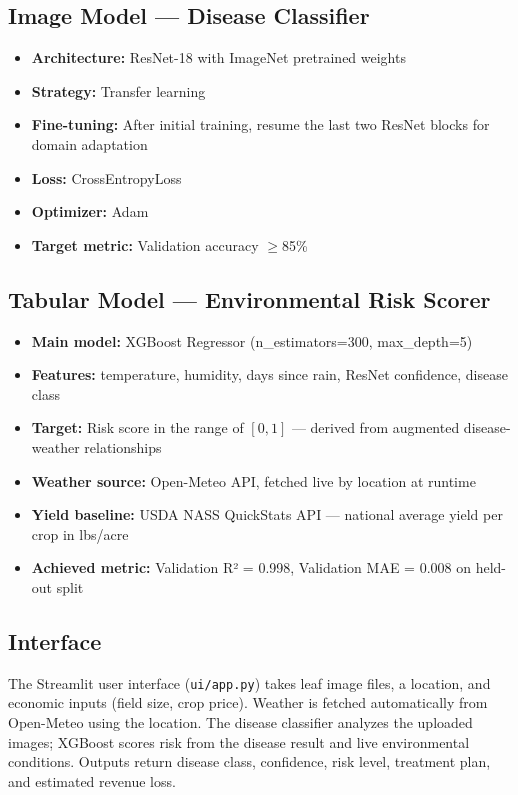 \documentclass[11pt, letterpaper]{article}
\begin{document}
\vspace{0.5em}

\subsection{Image Model — Disease Classifier}
\begin{itemize}
  \item \textbf{Architecture:} ResNet-18 with ImageNet pretrained weights
  \item \textbf{Strategy:} Transfer learning
  \item \textbf{Fine-tuning:} After initial training, resume the last two ResNet blocks for domain adaptation
  \item \textbf{Loss:} CrossEntropyLoss
  \item\textbf{Optimizer:} Adam 
  \item \textbf{Target metric:} Validation accuracy $\geq$85\%
\end{itemize}

\subsection{Tabular Model — Environmental Risk Scorer}
\begin{itemize}
  \item \textbf{Main model:} XGBoost Regressor (n\_estimators=300, max\_depth=5)
  \item \textbf{Features:} temperature, humidity, days since rain, ResNet confidence, disease class
  \item \textbf{Target:} Risk score in  the range of $[0, 1]$ — derived from augmented disease-weather relationships
  \item \textbf{Weather source:} Open-Meteo API, fetched live by location at runtime
  \item \textbf{Yield baseline:} USDA NASS QuickStats API — national average yield per crop in lbs/acre
  \item \textbf{Achieved metric:} Validation R² = 0.998, Validation MAE = 0.008 on held-out split
\end{itemize}

\subsection{Interface}
The Streamlit user interface (\texttt{ui/app.py}) takes leaf image files, a location, and economic inputs (field size, crop price). Weather is fetched automatically from Open-Meteo using the location. The disease classifier analyzes the uploaded images; XGBoost scores risk from the disease result and live environmental conditions. Outputs return disease class, confidence, risk level, treatment plan, and estimated revenue loss. 
\end{document}
